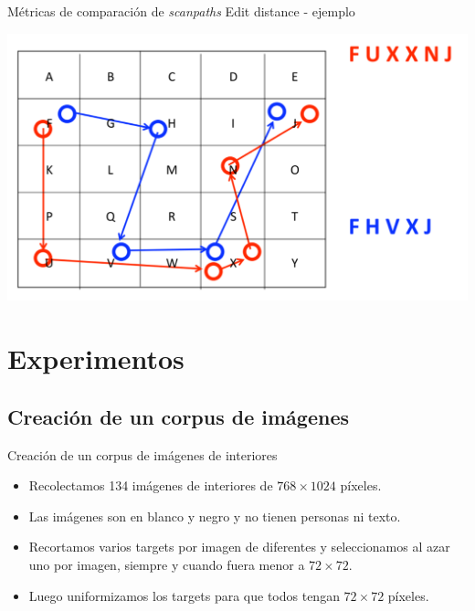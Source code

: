 \documentclass[compress]{beamer}
\begin{document}
\begin{frame}{Métricas de comparación de \textit{scanpaths}}
{Edit distance - ejemplo}

\begin{center}
    \includegraphics[width=\linewidth]{images/edit-distance.png} 
\end{center}

\end{frame}


\section{Experimentos}
\subsection{Creación de un corpus de imágenes}
\begin{frame}{Creación de un corpus de imágenes de interiores}
\begin{itemize}
\item Recolectamos 134 imágenes de interiores de $768 \times 1024$ píxeles.
\item Las imágenes son en blanco y negro y no tienen personas ni texto.
\item Recortamos varios targets por imagen de diferentes y seleccionamos al azar uno por imagen, siempre y cuando fuera menor a $72 \times 72$.
\item Luego uniformizamos los targets para que todos tengan $72 \times 72$ píxeles.
\end{itemize}
\end{frame}
\end{document}
